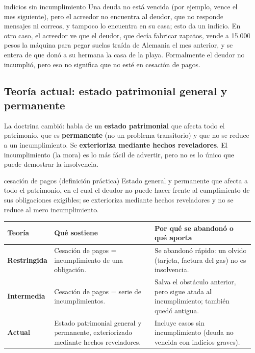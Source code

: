 \documentclass[12pt,oneside]{book}
\begin{document}
\begin{example}{indicios sin incumplimiento}
Una deuda no está vencida (por ejemplo, vence el mes siguiente), pero el acreedor no encuentra al deudor, que no responde mensajes ni correos, y tampoco lo encuentra en su casa; esto da un indicio. En otro caso, el acreedor ve que el deudor, que decía fabricar zapatos, vende a 15.000 pesos la máquina para pegar suelas traída de Alemania el mes anterior, y se entera de que donó a su hermana la casa de la playa. Formalmente el deudor no incumplió, pero eso no significa que no esté en cesación de pagos.
\end{example}

\subsection{Teoría actual: estado patrimonial general y permanente}

La doctrina cambió: habla de un \textbf{estado patrimonial} que afecta todo el patrimonio, que es \textbf{permanente} (no un problema transitorio) y que no se reduce a un incumplimiento. Se \textbf{exterioriza mediante hechos reveladores}. El incumplimiento (la mora) es lo más fácil de advertir, pero no es lo único que puede demostrar la insolvencia.

\begin{definition}{cesación de pagos (definición práctica)}
Estado general y permanente que afecta a todo el patrimonio, en el cual el deudor no puede hacer frente al cumplimiento de sus obligaciones exigibles; se exterioriza mediante hechos reveladores y no se reduce al mero incumplimiento.
\end{definition}

\begin{table}[H]
\centering
\small
\begin{tabularx}{\textwidth}{
    >{\raggedright\arraybackslash}p{}
    >{\raggedright\arraybackslash}X
    >{\raggedright\arraybackslash}X
}
\toprule
\textbf{Teoría} & \textbf{Qué sostiene} & \textbf{Por qué se abandonó o qué aporta} \\
\midrule
\textbf{Restringida} & Cesación de pagos = incumplimiento de una obligación. & Se abandonó rápido: un olvido (tarjeta, factura del gas) no es insolvencia. \\
\textbf{Intermedia} & Cesación de pagos = serie de incumplimientos. & Salva el obstáculo anterior, pero sigue atada al incumplimiento; también quedó antigua. \\
\textbf{Actual} & Estado patrimonial general y permanente, exteriorizado mediante hechos reveladores. & Incluye casos sin incumplimiento (deuda no vencida con indicios graves). \\
\bottomrule
\end{tabularx}
\end{table}
\end{document}
